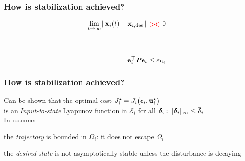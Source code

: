 \begin{frame} %
  \frametitle{How is stabilization achieved?}

     \begin{align}
       \lim\limits_{t \to \infty}\|\bm{\mathbf{x}}_i(t) - \bm{\mathbf{x}}_{i,\text{des}}\| \ \  \textcolor{red}{\xcancel{\to}} \ \ 0 \\[4ex] \\
       \bm{\mathbf{e}}_i^{\top} \bm{\mathit{P}} \bm{\mathbf{e}}_i \leq \varepsilon_{\Omega_i}
      \end{align}

\end{frame} %
\begin{frame} %
  \frametitle{How is stabilization achieved?}

  Can be shown that the optimal cost $J_i^{\star} = J_i\big(\bm{\mathbf{e}}_i, \overline{\bm{\mathbf{u}}}_i^{\star}\big)$\\[2ex]
  is an \textit{Input-to-state} Lyapunov function in $\mathcal{E}_i$ for all $\bm{\mathbf{\delta}}_i: \|\bm{\mathbf{\delta}}_i\|_{\infty} \leq \overline{\delta}_i$\\[4ex]

  In essence: \\
  \begin{wideitemize}
    \item the \textit{trajectory} is bounded in $\Omega_i$: it does not escape $\Omega_i$\\[2ex]
    \item the \textit{desired state} is not  asymptotically stable unless the disturbance is decaying
  \end{wideitemize}

\end{frame} %

